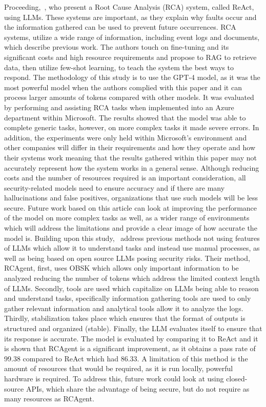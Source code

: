 Proceeding,~\cite{10.1145/3663529.3663841}, who present a Root Cause Analysis (RCA) system, called ReAct, using LLMs. These systems are important, as they explain why faults occur and the information gathered can be used to prevent future occurrences. RCA systems, utilize a wide range of information, including event logs and documents, which describe previous work. The authors touch on fine-tuning and its significant costs and high resource requirements and propose to RAG to retrieve data, then utilize few-shot learning, to teach the system the best ways to respond. The methodology of this study is to use the GPT-4 model, as it was the most powerful model when the authors complied with this paper and it can process larger amounts of tokens compared with other models. It was evaluated by performing and assisting RCA tasks when implemented into an Azure department within Microsoft. The results showed that the model was able to complete generic tasks, however, on more complex tasks it made severe errors. In addition, the experiments were only held within Microsoft’s environment and other companies will differ in their requirements and how they operate and how their systems work meaning that the results gathered within this paper may not accurately represent how the system works in a general sense. Although reducing costs and the number of resources required is an important consideration, all security-related models need to ensure accuracy and if there are many hallucinations and false positives, organizations that use such models will be less secure. Future work based on this article can look at improving the performance of the model on more complex tasks as well, as a wider range of environments which will address the limitations and provide a clear image of how accurate the model is. Building upon this study,~\cite{wang2024rcagent} address previous methods not using features of LLMs which allow it to understand tasks and instead use manual processes, as well as being based on open source LLMs posing security risks. Their method, RCAgent, first, uses OBSK which allows only important information to be analyzed reducing the number of tokens which address the limited context length of LLMs. Secondly, tools are used which capitalize on LLMs being able to reason and understand tasks, specifically information gathering tools are used to only gather relevant information and analytical tools allow it to analyze the logs. Thirdly, stabilization takes place which ensures that the format of outputs is structured and organized (stable). Finally, the LLM evaluates itself to ensure that its response is accurate. The model is evaluated by comparing it to ReAct and it is shown that RCAgent is a significant improvement, as it obtains a pass rate of 99.38 compared to ReAct which had 86.33. A limitation of this method is the amount of resources that would be required, as it is run locally, powerful hardware is required. To address this, future work could look at using closed-source APIs, which share the advantage of being secure, but do not require as many resources as RCAgent.

